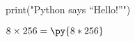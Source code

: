 \documentclass{article}
\newcommand{\pymultiply}[2]{\py{#1*#2}}
\begin{document}
\begin{pycode}
print("Python says ``Hello!''")
\end{pycode}

$8 \times 256 = \pymultiply{8}{256}$
\end{document}
